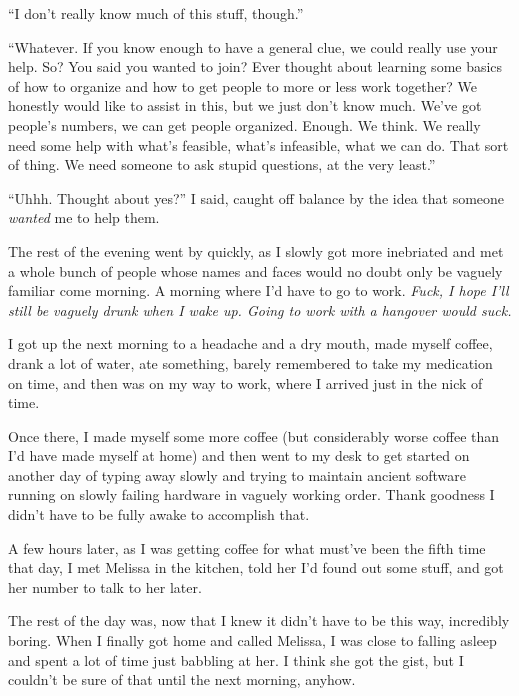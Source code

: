 ``I don't really know much of this stuff, though.''

``Whatever. If you know enough to have a general clue, we could really use your
help. So? You said you wanted to join? Ever thought about learning some basics
of how to organize and how to get people to more or less work together? We
honestly would like to assist in this, but we just don't know much. We've got
people's numbers, we can get people organized. Enough. We think. We really
need some help with what's feasible, what's infeasible, what we can do. That
sort of thing. We need someone to ask stupid questions, at the very least.''

``Uhhh. Thought about yes?'' I said, caught off balance by the idea that someone
\textit{wanted} me to help them.

The rest of the evening went by quickly, as I slowly got more inebriated and met
a whole bunch of people whose names and faces would no doubt only be vaguely
familiar come morning. A morning where I'd have to go to work. \textit{Fuck, I
  hope I'll still be vaguely drunk when I wake up. Going to work with a
  hangover would suck.}

\spacer

I got up the next morning to a headache and a dry mouth, made myself coffee,
drank a lot of water, ate something, barely remembered to take my medication on
time, and then was on my way to work, where I arrived just in the nick of time.

Once there, I made myself some more coffee (but considerably worse coffee than
I'd have made myself at home) and then went to my desk to get
started on another day of typing away slowly and trying to maintain ancient
software running on slowly failing hardware in vaguely working order. Thank
goodness I didn't have to be fully awake to accomplish that.

\spacer

A few hours later, as I was getting coffee for what must've been the fifth time
that day, I met Melissa in the kitchen, told her I'd found out some stuff, and
got her number to talk to her later.

The rest of the day was, now that I knew it didn't have to be this way,
incredibly boring. When I finally got home and called Melissa, I was close to
falling asleep and spent a lot of time just babbling at her. I think she got the
gist, but I couldn't be sure of that until the next morning, anyhow.

